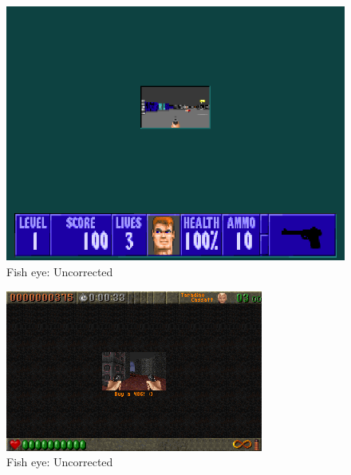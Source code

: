   \begin{figure}[H]
\centering
 \includegraphics[width=\textwidth]{imgs/adjust_view/small.png}
  \caption{Fish eye: Uncorrected} 
 \end{figure}
 \par


    \begin{figure}[H]
\centering
 \includegraphics[width=\textwidth]{imgs/adjust_view/rott.png}
  \caption{Fish eye: Uncorrected} 
 \end{figure}
 \par